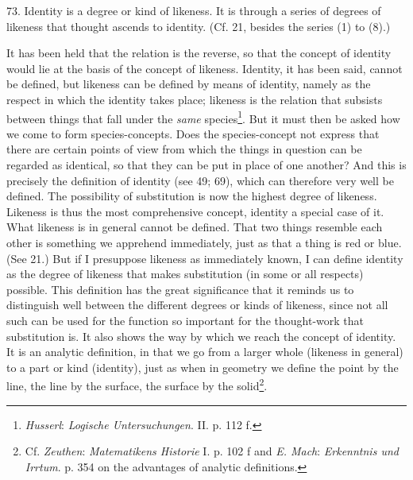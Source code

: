 \documentclass[12pt,a4paper]{book}
\newcommand{\opage}[1]{\marginnote{\footnotesize\textit{[#1]}}}
\begin{document}
73. Identity is a degree or kind of likeness. It is through a series of
degrees of likeness that thought ascends to identity. (Cf. 21, besides the
series (1) to (8).)

It has been held that the relation is the reverse, so that the concept of
identity would lie at the basis of the concept of likeness. Identity, it has
been said, cannot be defined, but likeness can be defined by means of
identity, namely as the respect in which the identity takes place; likeness
is the relation that subsists between things that fall under the \emph{same}
species\footnote{\emph{Husserl}: \emph{Logische Untersuchungen}. II. p. 112
f.}. But it must then be asked how we come to form species-concepts. Does
the species-concept not express that there are certain points of view from
which the things in question can be regarded as identical, so that they can
be put in place of one another? And this is precisely the definition of
identity (see 49; 69), which can therefore very well be defined. The
possibility of substitution is now the highest degree of likeness. Likeness
is thus the most comprehensive concept, identity a special case of it. What
likeness is in general cannot be defined. That two things resemble each
other is something we apprehend immediately, just as that a thing is red or
blue. (See 21.) But if I presuppose likeness as immediately known, I can
define identity as the degree of likeness that makes substitution (in some or
all respects) possible. This definition has the great significance that it
reminds us to distinguish well between the different degrees or kinds of
likeness, since not all such can be used for the function so important for
the thought-work that substitution is. It also shows the way by which we
reach the concept of identity. It is an analytic definition, in that we go
from a larger whole (likeness in general) \opage{178}to a part or kind (identity), just
as when in geometry we define the point by the line, the line by the
surface, the surface by the solid\footnote{Cf. \emph{Zeuthen}:
\emph{Matematikens Historie} I. p. 102 f and \emph{E. Mach}: \emph{Erkenntnis
und Irrtum}. p. 354 on the advantages of analytic definitions.}.
\end{document}

